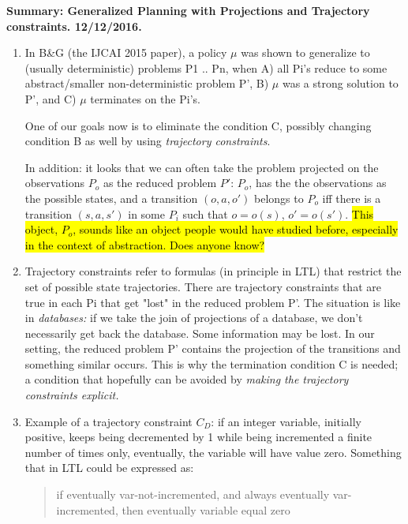 \documentclass{article}
\newcommand\sr[1]{\hl{#1}}
\begin{document}
\noindent \textbf{Summary: Generalized Planning with Projections and Trajectory constraints. 12/12/2016.}

\begin{enumerate}
  
\item In B\&G (the IJCAI 2015 paper), a policy $\mu$ was shown to generalize to
(usually deterministic) problems P1 .. Pn, when A) all Pi's reduce to some
abstract/smaller non-deterministic problem P', B) $\mu$ was a strong solution
to P', and C) $\mu$ terminates on the Pi's.

One of our goals now is to eliminate the condition C, possibly changing condition
B as well by using  \emph{trajectory constraints}.

In addition: it looks that we can often take the problem projected
on the observations $P_o$ as the reduced problem $P'$: $P_o$, has the
the observations as the possible states, and a transition $(o,a,o')$
belongs to $P_o$ iff there is a transition  $(s,a,s')$ in some $P_i$
such that $o=o(s)$, $o'=o(s')$. \sr{This object, $P_o$, sounds like
an object people would have studied before, especially in the context
of abstraction. Does anyone know?}

\item  Trajectory constraints refer to formulas (in principle in LTL)
  that restrict the set of possible state trajectories. 
 There  are trajectory constraints that are true in each Pi that get  "lost" in the
reduced problem P'. The situation is like in \emph{databases:}
if we take the join of projections of a database, we don't necessarily get back the database.
Some information may be lost. In our setting, the reduced problem P' contains the projection
of the transitions and something similar occurs.
This is why the termination condition C is needed;
a condition that hopefully can be  avoided by \emph{making
the trajectory constraints explicit.}

\item  Example of a trajectory constraint $C_D$: if an
integer variable, initially positive, keeps being
decremented by 1 while being incremented a finite
number of times only, eventually, the variable
will have value zero. Something that in LTL could
be expressed as:

\begin{quotation}
\noindent if eventually var-not-incremented, and always eventually var-incremented, then
eventually variable equal zero
\end{quotation}


\end{enumerate}
\end{document}

